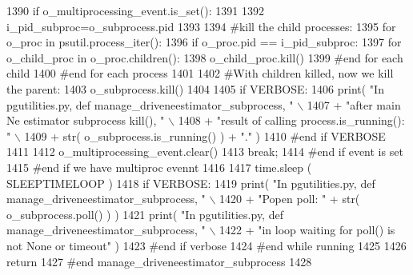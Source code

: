 \begin{DoxyCode}
1390             \textcolor{keywordflow}{if} o\_multiprocessing\_event.is\_set():
1391 
1392                 i\_pid\_subproc=o\_subprocess.pid
1393 
1394                 \textcolor{comment}{#kill the child processes:}
1395                 \textcolor{keywordflow}{for} o\_proc \textcolor{keywordflow}{in} psutil.process\_iter():
1396                     \textcolor{keywordflow}{if} o\_proc.pid == i\_pid\_subproc:
1397                         \textcolor{keywordflow}{for} o\_child\_proc \textcolor{keywordflow}{in} o\_proc.children():
1398                             o\_child\_proc.kill()
1399                         \textcolor{comment}{#end for each child}
1400                 \textcolor{comment}{#end for each process}
1401 
1402                 \textcolor{comment}{#With children killed, now we kill the parent:}
1403                 o\_subprocess.kill()
1404 
1405                 \textcolor{keywordflow}{if} VERBOSE:
1406                     print( \textcolor{stringliteral}{"In pgutilities.py, def manage\_driveneestimator\_subprocess, "} \(\backslash\)
1407                                 + \textcolor{stringliteral}{"after main Ne estimator subprocess kill(), "} \(\backslash\)
1408                                 + \textcolor{stringliteral}{"result of calling process.is\_running(): "} \(\backslash\)
1409                                 + str( o\_subprocess.is\_running() )  + \textcolor{stringliteral}{"."} )
1410                 \textcolor{comment}{#end if VERBOSE}
1411 
1412                 o\_multiprocessing\_event.clear()
1413                 \textcolor{keywordflow}{break};
1414             \textcolor{comment}{#end if event is set}
1415         \textcolor{comment}{#end if we have multiproc evennt}
1416 
1417         time.sleep ( SLEEPTIMELOOP )
1418         \textcolor{keywordflow}{if} VERBOSE:
1419             print( \textcolor{stringliteral}{"In pgutilities.py, def manage\_driveneestimator\_subprocess, "} \(\backslash\)
1420                         + \textcolor{stringliteral}{"Popen poll: "} + str( o\_subprocess.poll() ) ) 
1421             print( \textcolor{stringliteral}{"In pgutilities.py, def manage\_driveneestimator\_subprocess, "} \(\backslash\)
1422                         + \textcolor{stringliteral}{"in loop waiting for poll() is not None or timeout"} )
1423         \textcolor{comment}{#end if verbose}
1424     \textcolor{comment}{#end while running}
1425 
1426     \textcolor{keywordflow}{return}
1427 \textcolor{comment}{#end manage\_driveneestimator\_subprocess}
1428 
\end{DoxyCode}
